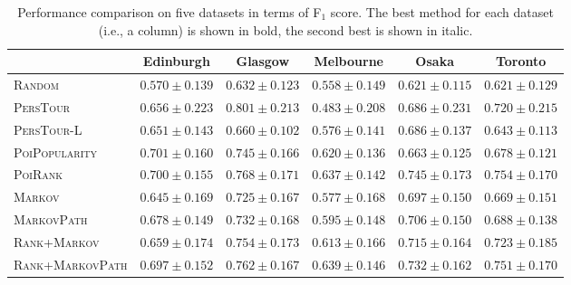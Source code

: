 \begin{table*}[t]
\caption{Performance comparison on five datasets in terms of F$_1$ score. 
        The best method for each dataset (i.e., a column) is shown in bold, the second best is shown in italic.}
\label{tab:f1}
\centering
\setlength{\tabcolsep}{10pt} %
\begin{tabular}{l|ccccc} \hline
 & Edinburgh & Glasgow & Melbourne & Osaka & Toronto \\ \hline
\textsc{Random} & $0.570\pm0.139$ & $0.632\pm0.123$ & $0.558\pm0.149$ & $0.621\pm0.115$ & $0.621\pm0.129$ \\
\textsc{PersTour}\cite{ijcai15} & $0.656\pm0.223$ & $\mathbf{0.801\pm0.213}$ & $0.483\pm0.208$ & $0.686\pm0.231$ & $0.720\pm0.215$ \\
\textsc{PersTour-L} & $0.651\pm0.143$ & $0.660\pm0.102$ & $0.576\pm0.141$ & $0.686\pm0.137$ & $0.643\pm0.113$ \\
\textsc{PoiPopularity} & $\mathbf{0.701\pm0.160}$ & $0.745\pm0.166$ & $0.620\pm0.136$ & $0.663\pm0.125$ & $0.678\pm0.121$ \\
\textsc{PoiRank} & $\mathit{0.700\pm0.155}$ & $\mathit{0.768\pm0.171}$ & $\mathit{0.637\pm0.142}$ & $\mathbf{0.745\pm0.173}$ & $\mathbf{0.754\pm0.170}$ \\
\textsc{Markov} & $0.645\pm0.169$ & $0.725\pm0.167$ & $0.577\pm0.168$ & $0.697\pm0.150$ & $0.669\pm0.151$ \\
\textsc{MarkovPath} & $0.678\pm0.149$ & $0.732\pm0.168$ & $0.595\pm0.148$ & $0.706\pm0.150$ & $0.688\pm0.138$ \\
\textsc{Rank+Markov} & $0.659\pm0.174$ & $0.754\pm0.173$ & $0.613\pm0.166$ & $0.715\pm0.164$ & $0.723\pm0.185$ \\
\textsc{Rank+MarkovPath} & $0.697\pm0.152$ & $0.762\pm0.167$ & $\mathbf{0.639\pm0.146}$ & $\mathit{0.732\pm0.162}$ & $\mathit{0.751\pm0.170}$ \\
\hline
\end{tabular}
\vspace{-1.2em}
\end{table*}

